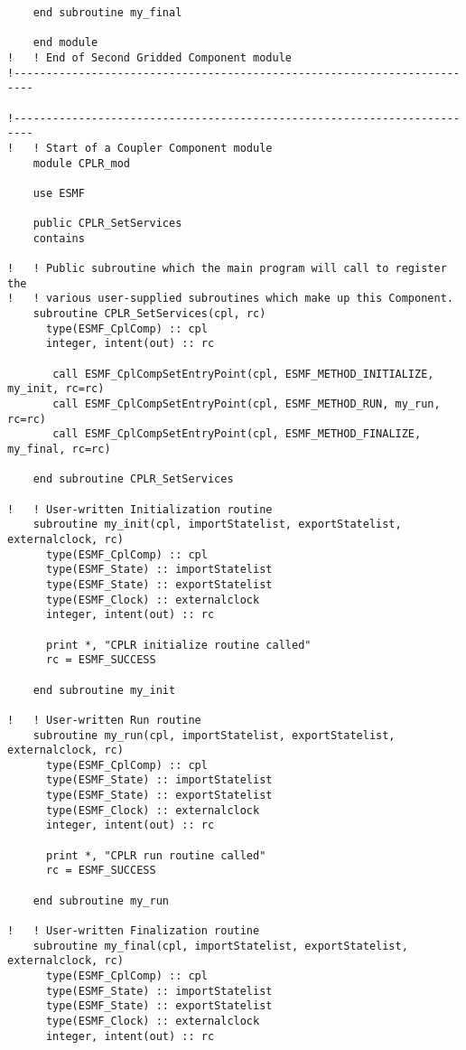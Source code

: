 \begin{verbatim}
    end subroutine my_final

    end module
!   ! End of Second Gridded Component module
!-------------------------------------------------------------------------

!-------------------------------------------------------------------------
!   ! Start of a Coupler Component module
    module CPLR_mod

    use ESMF

    public CPLR_SetServices
    contains

!   ! Public subroutine which the main program will call to register the
!   ! various user-supplied subroutines which make up this Component.
    subroutine CPLR_SetServices(cpl, rc)
      type(ESMF_CplComp) :: cpl
      integer, intent(out) :: rc

       call ESMF_CplCompSetEntryPoint(cpl, ESMF_METHOD_INITIALIZE, my_init, rc=rc)
       call ESMF_CplCompSetEntryPoint(cpl, ESMF_METHOD_RUN, my_run, rc=rc)
       call ESMF_CplCompSetEntryPoint(cpl, ESMF_METHOD_FINALIZE, my_final, rc=rc)
      
    end subroutine CPLR_SetServices
      
!   ! User-written Initialization routine
    subroutine my_init(cpl, importStatelist, exportStatelist, externalclock, rc)
      type(ESMF_CplComp) :: cpl
      type(ESMF_State) :: importStatelist
      type(ESMF_State) :: exportStatelist
      type(ESMF_Clock) :: externalclock
      integer, intent(out) :: rc

      print *, "CPLR initialize routine called"
      rc = ESMF_SUCCESS

    end subroutine my_init

!   ! User-written Run routine
    subroutine my_run(cpl, importStatelist, exportStatelist, externalclock, rc)
      type(ESMF_CplComp) :: cpl
      type(ESMF_State) :: importStatelist
      type(ESMF_State) :: exportStatelist
      type(ESMF_Clock) :: externalclock
      integer, intent(out) :: rc

      print *, "CPLR run routine called"
      rc = ESMF_SUCCESS

    end subroutine my_run

!   ! User-written Finalization routine
    subroutine my_final(cpl, importStatelist, exportStatelist, externalclock, rc)
      type(ESMF_CplComp) :: cpl
      type(ESMF_State) :: importStatelist
      type(ESMF_State) :: exportStatelist
      type(ESMF_Clock) :: externalclock
      integer, intent(out) :: rc


\end{verbatim}
